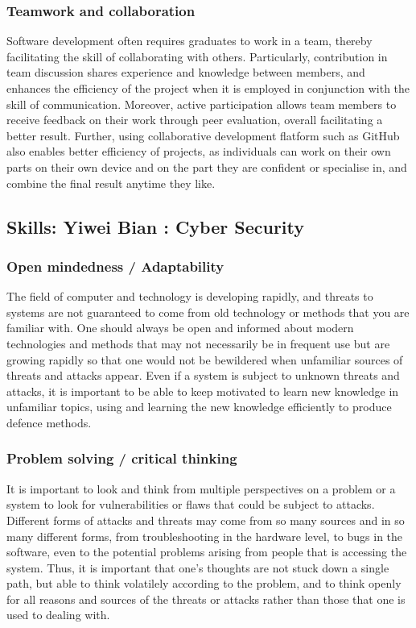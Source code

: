 \documentclass[a4paper, 11pt]{report}
\begin{document}
\subsubsection{Teamwork and collaboration}
Software development often requires graduates to work in a team, thereby facilitating the skill of collaborating with others. Particularly, contribution in team discussion shares experience and knowledge between members, and enhances the efficiency of the project when it is employed in conjunction with the skill of communication. Moreover, active participation allows team members to receive feedback on their work through peer evaluation, overall facilitating a better result. Further, using collaborative development flatform such as GitHub also enables better efficiency of projects, as individuals can work on their own parts on their own device and on the part they are confident or specialise in, and combine the final result anytime they like.


\subsection{Skills: Yiwei Bian : Cyber Security}
\subsubsection{Open mindedness / Adaptability}
The field of computer and technology is developing rapidly, and threats to systems are not guaranteed to come from old technology or methods that you are familiar with. One should always be open and informed about modern technologies and methods that may not necessarily be in frequent use but are growing rapidly so that one would not be bewildered when unfamiliar sources of threats and attacks appear. Even if a system is subject to unknown threats and attacks, it is important to be able to keep motivated to learn new knowledge in unfamiliar topics, using and learning the new knowledge efficiently to produce defence methods.
\subsubsection{Problem solving / critical thinking}
It is important to look and think from multiple perspectives on a problem or a system to look for vulnerabilities or flaws that could be subject to attacks. Different forms of attacks and threats may come from so many sources and in so many different forms, from troubleshooting in the hardware level, to bugs in the software, even to the potential problems arising from people that is accessing the system. Thus, it is important that one’s thoughts are not stuck down a single path, but able to think volatilely according to the problem, and to think openly for all reasons and sources of the threats or attacks rather than those that one is used to dealing with.  
\end{document}
